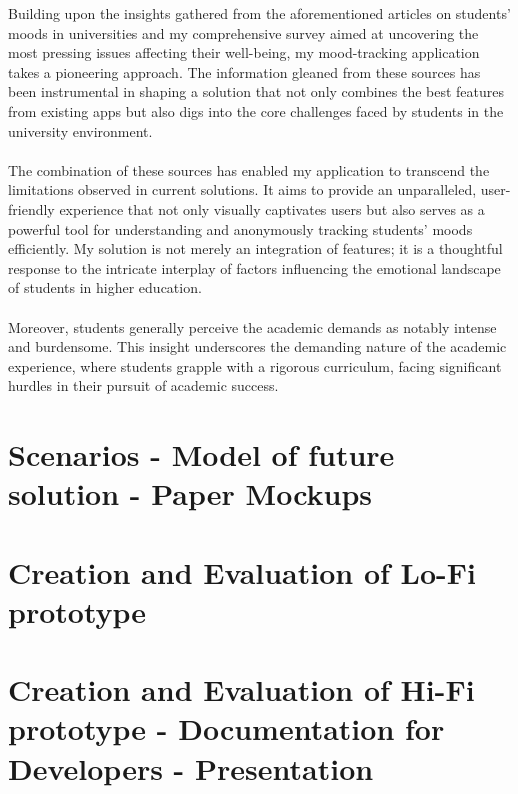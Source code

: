 \documentclass[11pt]{report}
\begin{document}
Building upon the insights gathered from the aforementioned articles on students' moods in universities and my comprehensive survey aimed at uncovering the most pressing issues affecting their well-being, my mood-tracking application takes a pioneering approach. The information gleaned from these sources has been instrumental in shaping a solution that not only combines the best features from existing apps but also digs into the core challenges faced by students in the university environment.\\ \\
The combination of these sources has enabled my application to transcend the limitations observed in current solutions. It aims to provide an unparalleled, user-friendly experience that not only visually captivates users but also serves as a powerful tool for understanding and anonymously tracking students' moods efficiently. My solution is not merely an integration of features; it is a thoughtful response to the intricate interplay of factors influencing the emotional landscape of students in higher education.\\ \\
Moreover, students generally perceive the academic demands as notably intense and burdensome. This insight underscores the demanding nature of the academic experience, where students grapple with a rigorous curriculum, facing significant hurdles in their pursuit of academic success.


\chapterfont{\LARGE \centering}
\chaptertitlefont{\Large \centering}
\chapter{Scenarios - Model of future solution - Paper Mockups}


\chapterfont{\LARGE \centering}
\chaptertitlefont{\Large \centering}
\chapter{Creation and Evaluation of  Lo-Fi prototype}


\chapterfont{\LARGE \centering}
\chaptertitlefont{\Large \centering}
\chapter{Creation and Evaluation of  Hi-Fi prototype - Documentation for Developers - Presentation}

\printbibliography
\end{document}
